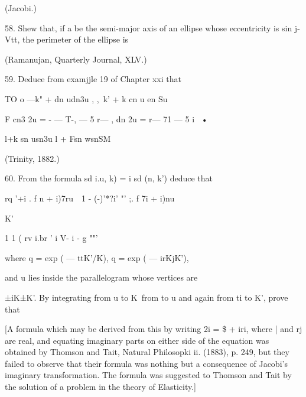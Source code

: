 (Jacobi.)

58. Shew that, if a be the semi-major axis of an ellipse whose
eccentricity is sin j-Vtt, the perimeter of the ellipse is

(Ramanujan, Quarterly Journal, XLV.)

59. Deduce from examjjle 19 of Chapter xxi that

TO o —k" + dn udn3u , ,\ k' + k cn u en Su

F cn3 2u = - — T-, — 5 r— , dn 2u = r— 71 — 5 i~ •

l+k sn usn3u l + Fsn wsnSM

(Trinity, 1882.)

60. From the formula sd i.u, k) = i sd (n, k') deduce that

rq '+i . f n + i)7ru\ \ 1 - (-)'*?i' "' ;. f 7i + i)nu

K'

1 1 ( rv i.br ' i V- i - g ""'

where q = exp ( — ttK'/K), q = exp ( — irKjK'),

and u lies inside the parallelogram whose vertices are

±iK±K'. By integrating from u to K\ from to u and again from ti to K',
prove that

[A formula which may be derived from this by writing 2i = \$ + iri,
where | and rj are real, and equating imaginary parts on either side
of the equation was obtained by Thomson and Tait, Natural Philosopki
ii. (1883), p. 249, but they failed to observe that their formula was
nothing but a consequence of Jacobi's imaginary transformation. The
formula was suggested to Thomson and Tait by the solution of a problem
in the theory of Elasticity.]

